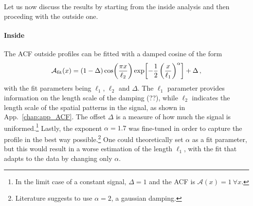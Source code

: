 Let us now discuss the results by starting from the inside analysis and then proceding with the outside one.

\paragraph{Inside}
The ACF outside profiles can be fitted with a damped cosine of the form
\begin{equation}
    \mathcal{A}_{\rm fit}(x) = (1 - \Delta)\cos(\frac{\pi x}{\ell_2})\exp[-\frac{1}{2}\left(\frac{x}{\ell_1}\right)^\alpha] + \Delta\, ,
    \label{eq:damp}
\end{equation}
with the fit parameters being $\ell_1$, $\ell_2$ and $\Delta$. The $\ell_1$ parameter provides information on the length scale of the damping (??), while $\ell_2$ indicates the length scale of the spatial patterns in the signal, as shown in App.\ \ref{chap:app_ACF}. The offset $\Delta$ is a measure of how much the signal is uniformed.\footnote{In the limit case of a constant signal, $\Delta = 1$ and the ACF is $\mathcal{A}(x) = 1\ \forall x$.}
Lastly, the exponent $\alpha = 1.7$ was fine-tuned in order to capture the profile in the best way possible.\footnote{Literature suggests to use $\alpha = 2$, a gaussian damping.} One could theoretically set $\alpha$ as a fit parameter, but this would result in a worse estimation of the length $\ell_1$, with the fit that adapts to the data by changing only $\alpha$. 

